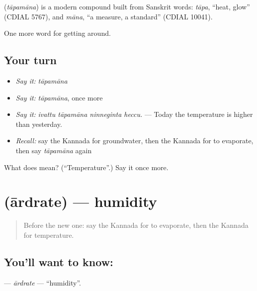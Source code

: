 \begin{cousinweb}
\textbf{} (\emph{tāpamāna}) is a modern compound built from Sanskrit words: \emph{tāpa}, \textquotedblleft{}heat, glow\textquotedblright{} (CDIAL 5767), and \emph{māna}, \textquotedblleft{}a measure, a standard\textquotedblright{} (CDIAL 10041).
\end{cousinweb}

\begin{grammarlens}[title={What you've built}]
One more word for getting around.
\end{grammarlens}

\subsection*{Your turn}
\begin{itemize}
\raggedright
  \item \emph{Say it:} \emph{tāpamāna}
  \item \emph{Say it:} \emph{tāpamāna}, once more
  \item \emph{Say it:} \emph{ivattu tāpamāna ninneginta heccu.} — Today the temperature is higher than yesterday.
  \item \emph{Recall:} say the Kannada for groundwater, then the Kannada for to evaporate, then say \emph{tāpamāna} again
\end{itemize}

\begin{tcolorbox}[breakable,colback=teal!4,colframe=teal!35!black,title={Before you move on}]
What does  mean? (\textquotedblleft{}Temperature\textquotedblright{}.) Say it once more.
\end{tcolorbox}
\section[\texorpdfstring{\kn{ಆರ್ದ್ರತೆ} (ārdrate)}{ಆರ್ದ್ರತೆ (ārdrate)}]{ (ārdrate) — humidity}

\label{lesson:KA-C484-ardrate}



\begin{quote}
Before the new one: say the Kannada for to evaporate, then the Kannada for temperature.
\end{quote}

\subsection*{You'll want to know: }
\textbf{} — \emph{ārdrate} — \textquotedblleft{}humidity\textquotedblright{}.

